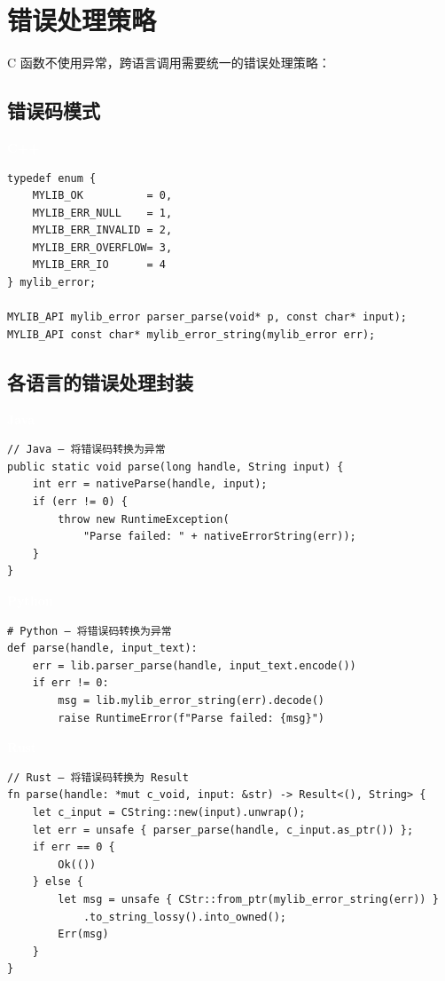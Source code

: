 \documentclass[12pt,a4paper,fontset=fandol]{ctexbook}
\newcommand{\cpplabel}{%
  \begin{tcolorbox}[enhanced,colback=cppheadbg,colframe=cppheadbg,
    arc=1mm,boxrule=0mm,left=6pt,right=6pt,top=2pt,bottom=2pt,
    halign=left,oversize]
    \textcolor{white}{\small\bfseries C++}
  \end{tcolorbox}\vspace{-4pt}}
\newcommand{\javalabel}{%
  \begin{tcolorbox}[enhanced,colback=javaheadbg,colframe=javaheadbg,
    arc=1mm,boxrule=0mm,left=6pt,right=6pt,top=2pt,bottom=2pt,
    halign=left,oversize]
    \textcolor{white}{\small\bfseries Java}
  \end{tcolorbox}\vspace{-4pt}}
\newcommand{\rustlabel}{%
  \begin{tcolorbox}[enhanced,colback=rustheadbg,colframe=rustheadbg,
    arc=1mm,boxrule=0mm,left=6pt,right=6pt,top=2pt,bottom=2pt,
    halign=left,oversize]
    \textcolor{white}{\small\bfseries Rust}
  \end{tcolorbox}\vspace{-4pt}}
\newcommand{\pythonlabel}{%
  \begin{tcolorbox}[enhanced,colback=pythonheadbg,colframe=pythonheadbg,
    arc=1mm,boxrule=0mm,left=6pt,right=6pt,top=2pt,bottom=2pt,
    halign=left,oversize]
    \textcolor{white}{\small\bfseries Python}
  \end{tcolorbox}\vspace{-4pt}}
\begin{document}
\section{错误处理策略}

C 函数不使用异常，跨语言调用需要统一的错误处理策略：

\subsection{错误码模式}
\cpplabel
\begin{lstlisting}[style=cppstyle]
typedef enum {
    MYLIB_OK          = 0,
    MYLIB_ERR_NULL    = 1,
    MYLIB_ERR_INVALID = 2,
    MYLIB_ERR_OVERFLOW= 3,
    MYLIB_ERR_IO      = 4
} mylib_error;

MYLIB_API mylib_error parser_parse(void* p, const char* input);
MYLIB_API const char* mylib_error_string(mylib_error err);
\end{lstlisting}

\subsection{各语言的错误处理封装}

\javalabel
\begin{lstlisting}[style=javastyle]
// Java — 将错误码转换为异常
public static void parse(long handle, String input) {
    int err = nativeParse(handle, input);
    if (err != 0) {
        throw new RuntimeException(
            "Parse failed: " + nativeErrorString(err));
    }
}
\end{lstlisting}

\pythonlabel
\begin{lstlisting}[style=pythonstyle]
# Python — 将错误码转换为异常
def parse(handle, input_text):
    err = lib.parser_parse(handle, input_text.encode())
    if err != 0:
        msg = lib.mylib_error_string(err).decode()
        raise RuntimeError(f"Parse failed: {msg}")
\end{lstlisting}

\rustlabel
\begin{lstlisting}[style=ruststyle]
// Rust — 将错误码转换为 Result
fn parse(handle: *mut c_void, input: &str) -> Result<(), String> {
    let c_input = CString::new(input).unwrap();
    let err = unsafe { parser_parse(handle, c_input.as_ptr()) };
    if err == 0 {
        Ok(())
    } else {
        let msg = unsafe { CStr::from_ptr(mylib_error_string(err)) }
            .to_string_lossy().into_owned();
        Err(msg)
    }
}
\end{lstlisting}
\end{document}
